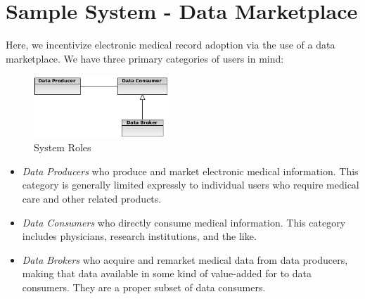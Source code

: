 \documentclass[10pt, conference, compsocconf]{IEEEtran}
\begin{document}
\section*{Sample System - Data Marketplace}
Here, we incentivize electronic medical record adoption via the use of a data marketplace.  We have three primary categories of users in mind:

\begin{figure}[!t]
\centering
\includegraphics[width=2in]{roles}
\caption{System Roles}
\label{System Roles}
\end{figure}

\begin{itemize}
\item \textit{Data Producers} who produce and market electronic medical information.  This category is generally limited expressly to individual users who require medical care and other related products.
\item \textit{Data Consumers} who directly consume medical information.  This category includes physicians, research institutions, and the like.
\item \textit{Data Brokers} who acquire and remarket medical data from data producers, making that data available in some kind of value-added for to data consumers.  They are a proper subset of data consumers.
\end{itemize}
\end{document}
